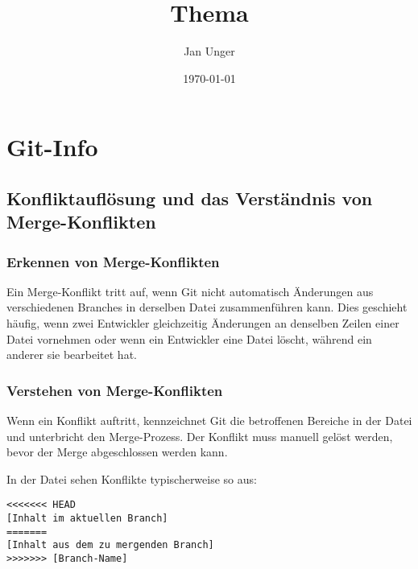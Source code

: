 \documentclass{vorlage-design-main}
\title{Thema}
\author{Jan Unger}
\date{\today}
\begin{document}
\maketitle

\begin{abstract}

\end{abstract}

\hypertarget{git-info}{%
\section{Git-Info}\label{git-info}}

\hypertarget{konfliktaufluxf6sung-und-das-verstuxe4ndnis-von-merge-konflikten}{%
\subsection{Konfliktauflösung und das Verständnis von
Merge-Konflikten}\label{konfliktaufloesung-und-das-verstaendnis-von-merge-konflikten}}

\hypertarget{erkennen-von-merge-konflikten}{%
\subsubsection{Erkennen von
Merge-Konflikten}\label{erkennen-von-merge-konflikten}}

Ein Merge-Konflikt tritt auf, wenn Git nicht automatisch Änderungen aus
verschiedenen Branches in derselben Datei zusammenführen kann. Dies
geschieht häufig, wenn zwei Entwickler gleichzeitig Änderungen an
denselben Zeilen einer Datei vornehmen oder wenn ein Entwickler eine
Datei löscht, während ein anderer sie bearbeitet hat.

\hypertarget{verstehen-von-merge-konflikten}{%
\subsubsection{Verstehen von
Merge-Konflikten}\label{verstehen-von-merge-konflikten}}

Wenn ein Konflikt auftritt, kennzeichnet Git die betroffenen Bereiche in
der Datei und unterbricht den Merge-Prozess. Der Konflikt muss manuell
gelöst werden, bevor der Merge abgeschlossen werden kann.

In der Datei sehen Konflikte typischerweise so aus:

\begin{lstlisting}
<<<<<<< HEAD
[Inhalt im aktuellen Branch]
=======
[Inhalt aus dem zu mergenden Branch]
>>>>>>> [Branch-Name]
\end{lstlisting}
\end{document}
